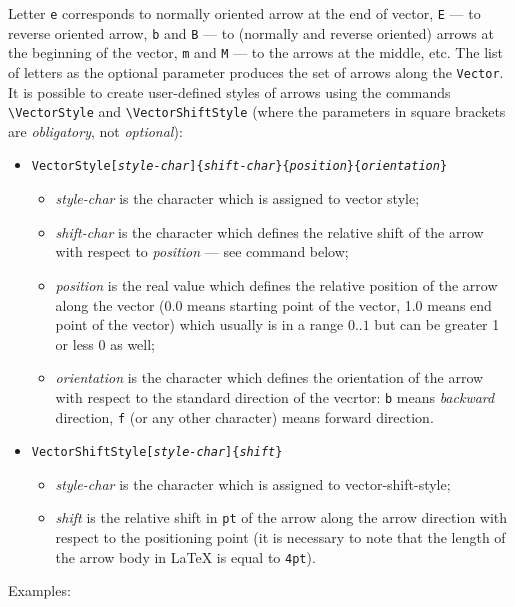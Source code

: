 Letter {\tt e} corresponds to normally oriented arrow
at the end of vector, {\tt E} --- to reverse oriented arrow,
{\tt b} and {\tt B} --- to (normally and reverse oriented) arrows at the
beginning of the vector, {\tt m} and {\tt M} --- to the arrows
at the middle, etc.
The list of letters as the optional parameter produces
the set of arrows along the {\tt Vector}.
It is possible to create user-defined styles of arrows using the commands
\verb?\VectorStyle? and \verb?\VectorShiftStyle? (where the parameters
in square brackets are {\em obligatory}, not {\em optional}):
\begin{itemize}
\item[] {\tt\bs{}VectorStyle[{\em style-char}]\{{\em shift-char}\}\{{\em position}\}\{{\em orientation}\}}
\begin{itemize}
\item {\em style-char} is the character which is assigned to vector style;
\item {\em shift-char} is the character which defines the relative shift
      of the arrow with respect to {\em position} --- see command
      {\tt{}} below;
\item {\em position} is the real value which defines the relative position
      of the arrow along the vector (0.0 means starting point of the vector,
      1.0 means end point of the vector) which usually is in a range
      $0..1$ but can be greater 1 or less 0 as well;
\item {\em orientation} is the character which defines the orientation
      of the arrow with respect to the standard direction of the vecrtor:
      {\tt b} means {\em backward} direction, {\tt f} (or any other
      character) means forward direction.
\end{itemize}
\item[] {\tt\bs{}VectorShiftStyle[{\em style-char}]\{{\em shift}\}}
\begin{itemize}
\item {\em style-char} is the character which is assigned to vector-shift-style;
\item {\em shift} is the relative shift in {\tt pt} of the arrow along
      the arrow direction with respect to the positioning point
      (it is necessary to note that the length of the arrow body in \LaTeX{}
      is equal to {\tt 4pt}).
\end{itemize}
\end{itemize}
Examples:
